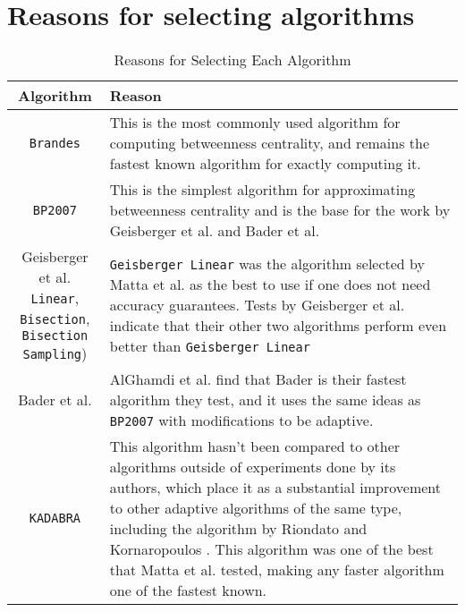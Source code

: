 \documentclass[12pt,a4paper,twoside,openright]{report}
\makeatletter
\newcommand{\ttt}[1]{\texttt{#1}}
\newcommand{\specialcell}[2][c]{%
	\begin{tabular}[#1]{@{}c@{}}#2\end{tabular}} %
\makeatother
\begin{document}
	\section{Reasons for selecting algorithms}
	\begin{table}[H]
		\label{tab:reasons}
		
		\renewcommand\arraystretch{1.5}

		\centering
		\caption{Reasons for Selecting Each Algorithm}
		\begin{tabularx}{\textwidth}{|c|X|}
			\hline
			\textbf{Algorithm} &
			\textbf{Reason} \\ 
			\hline
			
			\ttt{Brandes} \cite{brandes} &
			
			This is the most commonly used algorithm for computing betweenness centrality\cite{erdos}, and remains the fastest known algorithm for exactly computing it.\\ 
			\hline
			
			\ttt{BP2007} \cite{brandes2007} &
			
			This is the simplest algorithm for approximating betweenness centrality and is the base for the work by Geisberger et al. and Bader et al. \\ 
			\hline
			
			\specialcell[t]{Geisberger et al.\cite{geisberger}\\ \ttt{Linear},\\ \ttt{Bisection},\\ \ttt{Bisection Sampling})} &
			
			\ttt{Geisberger Linear} was the algorithm selected by Matta et al.\cite{comparesmall} as the best to use if one does not need accuracy guarantees. Tests by Geisberger et al. indicate that their other two algorithms perform even better than \ttt{Geisberger Linear}\\
			\hline
			
			
			Bader et al. \cite{bader} &
			
			AlGhamdi et al. find that Bader is their fastest algorithm they test, and it uses the same ideas as \ttt{BP2007} with modifications to be adaptive. \\ 
			\hline
			
			\ttt{KADABRA}\cite{borassi} &
			
			This algorithm hasn't been compared to other algorithms outside of experiments done by its authors, which place it as a substantial improvement to other adaptive algorithms of the same type, including the algorithm by Riondato and Kornaropoulos \cite{riondato}. This algorithm was one of the best that Matta et al. tested, making any faster algorithm one of the fastest known. \\ 
			\hline
			

\end{tabularx}
\end{table}
\end{document}
